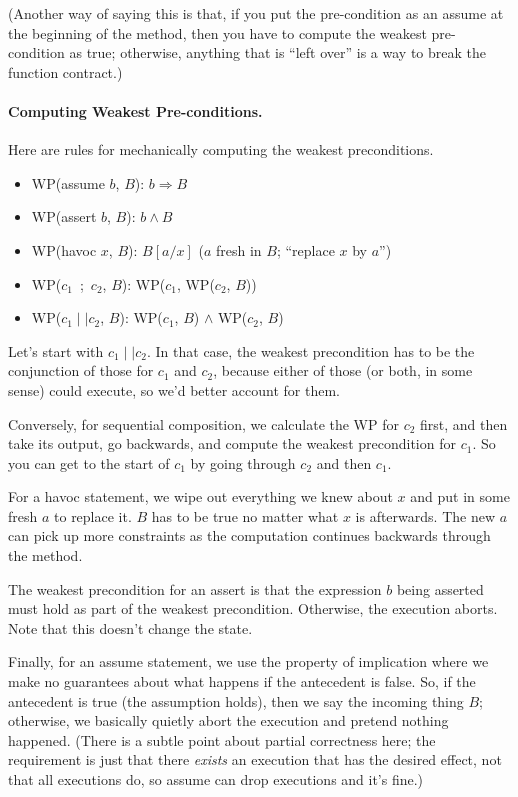 (Another way of saying this is that, if you put the pre-condition as an assume at the
beginning of the method, then you have to compute the weakest pre-condition as \textsf{true};
otherwise, anything that is ``left over'' is a way to break the function contract.)

\paragraph{Computing Weakest Pre-conditions.} Here are rules for mechanically computing
the weakest preconditions.

\begin{itemize}[noitemsep]
\item WP(\textsf{assume }$b$, $B$): $b \Rightarrow B$
\item WP(\textsf{assert }$b$, $B$): $b \wedge B$
\item WP(\textsf{havoc }$x$, $B$): $B[a/x]$ \hspace*{5em} ($a$ fresh in $B$; ``replace $x$ by $a$'')
\item WP($c_1$~;~$c_2$, $B$): WP($c_1$, WP($c_2$, $B$))
  \item WP($c_1 \mid\mid c_2$, $B$): WP($c_1$, $B$) $\wedge$ WP($c_2$, $B$)
\end{itemize}

Let's start with $c_1 \mid\mid c_2$. In that case, the weakest precondition has to be the conjunction of those for $c_1$ and $c_2$, because either of those
(or both, in some sense) could execute, so we'd better account for them.

Conversely, for sequential composition, we calculate the WP for $c_2$ first, and then take its output, go backwards, and compute the weakest precondition for
$c_1$. So you can get to the start of $c_1$ by going through $c_2$ and then $c_1$.

For a \textsf{havoc} statement, we wipe out everything we knew about $x$ and put in some fresh $a$ to replace it. $B$ has to be true no matter what $x$ is afterwards. The new $a$ can pick up more constraints
as the computation continues backwards through the method.

The weakest precondition for an \textsf{assert} is that the expression $b$ being asserted must hold as part of the weakest precondition. Otherwise, the execution aborts. Note that this doesn't change the state.

Finally, for an \textsf{assume} statement, we use the property of implication where we make no guarantees about what happens if the antecedent is false.
So, if the antecedent is true (the assumption holds), then we say the incoming thing $B$; otherwise, we basically quietly abort the execution and pretend nothing happened. (There is a subtle point about partial correctness here; the requirement is just that there \emph{exists} an execution that has the desired effect, not that all executions do, so \textsf{assume} can drop executions and it's fine.)

